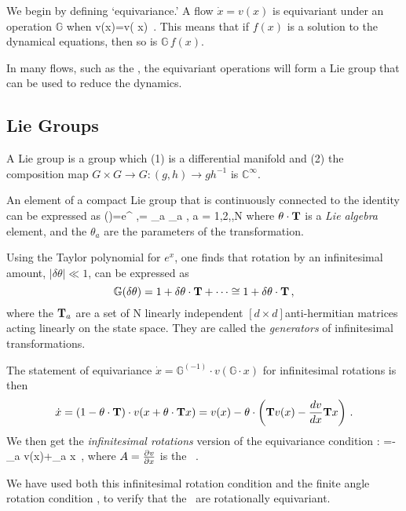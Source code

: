 We begin by defining `equivariance.'
A flow $\dot{x}= v(x)$ is equivariant under an operation $\mathbb{G}$ when
\beq
{} \cdot v(x)=v( \cdot x)
\,.
This means that if $f(x)$ is a solution to the dynamical equations, then so is $\mathbb{G}\,f(x)$.

In many flows, such as the \cLe, the equivariant operations will form a Lie group that can be used to reduce the dynamics.

\subsection{Lie Groups}

A Lie group is a group which (1) is a differential manifold and (2) the composition map $G \times G \rightarrow G : \left(g,h\right) \rightarrow g h^{-1}$ is $\mathbb{C}^\infty$.

An element of a compact Lie group that is continuously connected to the identity can be expressed as
\beq
{}(\theta)=e^{{\theta} \cdot \Lg },\quad \theta \cdot \Lg = \sum \theta_a \Lg_a , a = 1,2,\cdots,N
where $\theta \cdot \Lg$ is a \emph{Lie algebra} element, and the $\theta_a$ are the parameters of the transformation.

Using the Taylor polynomial for $e^{x}$, one finds that rotation by an infinitesimal amount, $|\delta \theta| \ll 1$, can be expressed as
\[
\mathbb{G}(\delta \theta)=1+\delta \theta \cdot \Lg  + \cdots \cong 1 + \delta \theta \cdot \Lg
\,,
\]
where the $\mathbf{T}_a$ are a set of N linearly independent $[d\times d]$anti-hermitian matrices acting linearly on the state space. They are called the \emph{generators} of infinitesimal transformations.

The statement of equivariance
$
\dot{x}=\mathbb{G}^{(-1)} \cdot v(\mathbb{G} \cdot x)
$
for infinitesimal rotations is then
\[
\dot{x}=(1-\theta \cdot \mathbf{T} ) \cdot v(x+\theta \cdot \mathbf{T}  x)
       =v(x)-\theta \cdot \left(
            \mathbf{T} v(x) - \frac{dv}{dx} \mathbf{T} x
                     \right)
\,.
\]
We then get the {\em infinitesimal
rotations} version of the equivariance condition
:
=- \Lg_a v(x)+\Mvar \Lg_a x
\,,
\label{eq:InfnmslRot}
\eeq
where $A = \frac{\partial v}{\partial x}$ is the \stabmat\ .

We have used both this infinitesimal rotation condition and
the finite angle rotation condition , to
verify that the \cLe\ are rotationally equivariant.


